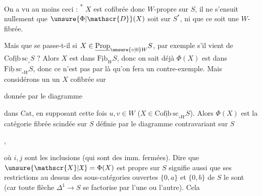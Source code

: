 
\margin{$\Vert$}
On a  vu au moins ceci : \textsuperscript{*} $X$ est cofibrée donc $W$-propre sur $S$, il ne s'ensuit nullement que $\unsure{\Phi|\mathscr{D}}(X)$ soit   sur $S^{*}$, ni que ce soit une $W$-fibrée.

Mais que se passe-t-il si $X\in\underline{\mathrm{Prop}}_{\unsure{\circ|0}W}S$, par exemple s'il  vient de $\underline{\mathrm{Cofib\,sc}}_{\circ}S$ ? Alors
  $X$ est dans $\underline{\mathrm{Fib}}_W S$, donc
on sait déjà  $\Phi(X)$ est dans $\underline{\mathrm{Fib\,sc}}_{\circ W}S$, donc ce n'est pas par là qu'on fera un contre-exemple. Mais considérons un un $X$ cofibrée sur


donnée par le diagramme


dans $\mathrm{Cat}$, en supposant cette fois $u,v\in W$ ($X\in\underline{\mathrm{Cofib\,sc}}_{\circ W}S$).  Alors $\Phi(X)$ est la catégorie fibrée scindée sur $S$ définie par le diagramme contravariant sur $S$

\quad,

où $i,j$ sont les inclusions (qui sont des imm. fermées). Dire que $\unsure{\mathscr{X}|\mathfrak{X}}=\Phi(X)$ est propre sur $S$ signifie aussi que ses restrictions au dessus des  sous-catégories ouvertes $\{0,a\}$ et $\{0,b\}$ de $S$ le sont (car toute flèche $\Delta^1\to S$ se factorise par l'une ou l'autre). Cela
